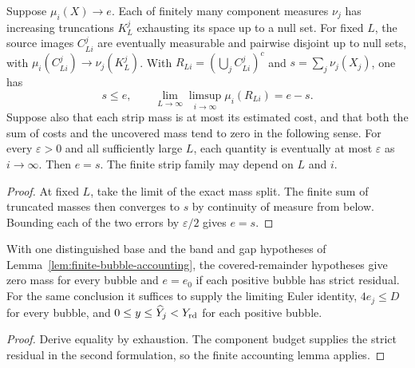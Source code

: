 \begin{theorem}
\label{thm:covered-measure-accounting}
\leanok
Suppose $\mu_i(X)\to e$. Each of finitely many component measures
$\nu_j$ has increasing truncations $K_L^j$ exhausting its space up to
a null set. For fixed $L$, the source images $C_{Li}^j$ are eventually
measurable and pairwise disjoint up to null sets, with
$\mu_i(C_{Li}^j)\to\nu_j(K_L^j)$. With $R_{Li}=(\bigcup_j C_{Li}^j)^c$
and $s=\sum_j\nu_j(X_j)$, one has
\[
 s\le e,\qquad \lim_{L\to\infty}\limsup_{i\to\infty}\mu_i(R_{Li})=e-s .
\]
Suppose also that each strip mass is at most its estimated cost, and
that both the sum of costs and the uncovered mass tend to zero in the
following sense. For every $\varepsilon>0$ and all sufficiently large
$L$, each quantity is eventually at most $\varepsilon$ as $i\to\infty$.
Then $e=s$. The finite strip family may depend on $L$ and $i$.
\end{theorem}
\begin{proof}
\leanok
At fixed $L$, take the limit of the exact mass split. The finite sum of
truncated masses then converges to $s$ by continuity of measure from
below. Bounding each of the two errors by $\varepsilon/2$ gives $e=s$.
\end{proof}

\begin{corollary}
\label{cor:covered-bubble-energies}
\leanok
With one distinguished base and the band and gap hypotheses of
Lemma~\ref{lem:finite-bubble-accounting}, the covered-remainder hypotheses
give zero mass for every bubble and $e=e_0$ if each positive bubble has
strict residual. For the same conclusion it suffices to supply the
limiting Euler identity, $4e_j\le D$ for every bubble, and
$0\le y\le\widehat Y_j<Y_{\rm rd}$ for each positive bubble.
\end{corollary}
\begin{proof}
\leanok
Derive equality by exhaustion. The component budget supplies the strict
residual in the second formulation, so the finite accounting lemma applies.
\end{proof}

